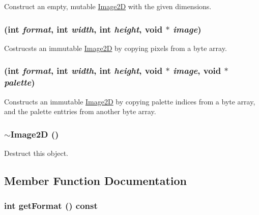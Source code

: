 Construct an empty, mutable \hyperlink{classm3g_1_1Image2D}{Image2D} with the given dimensions. \hypertarget{classm3g_1_1Image2D_8cf9a47f24ed50fe66686c1117fb048c}{
\subsubsection[{Image2D}]{ (int {\em format}, \/  int {\em width}, \/  int {\em height}, \/  void $\ast$ {\em image})}}
\label{classm3g_1_1Image2D_8cf9a47f24ed50fe66686c1117fb048c}


Costrucsts an immutable \hyperlink{classm3g_1_1Image2D}{Image2D} by copying pixels from a byte array. \hypertarget{classm3g_1_1Image2D_f498914ceac20ff9b1708c55ff1484e6}{
\subsubsection[{Image2D}]{ (int {\em format}, \/  int {\em width}, \/  int {\em height}, \/  void $\ast$ {\em image}, \/  void $\ast$ {\em palette})}}
\label{classm3g_1_1Image2D_f498914ceac20ff9b1708c55ff1484e6}


Constructs an immutable \hyperlink{classm3g_1_1Image2D}{Image2D} by copying palette indices from a byte array, and the palette enttries from another byte array. \hypertarget{classm3g_1_1Image2D_7ac703fe7edbb053dd2246ea1bb43200}{
\subsubsection[{$\sim$Image2D}]{\setlength{\rightskip}{0pt plus 5cm}$\sim${\bf Image2D} ()}}
\label{classm3g_1_1Image2D_7ac703fe7edbb053dd2246ea1bb43200}


Destruct this object. 

\subsection{Member Function Documentation}
\hypertarget{classm3g_1_1Image2D_c08e2752176d267cc4429d4d185975b8}{
\subsubsection[{getFormat}]{\setlength{\rightskip}{0pt plus 5cm}int getFormat () const}}
\label{classm3g_1_1Image2D_c08e2752176d267cc4429d4d185975b8}


